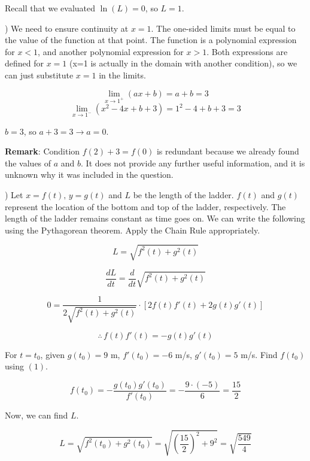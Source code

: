 \documentclass{article}
\begin{document}
\hfill

\noindent Recall that we evaluated $\ln(L) = 0$, so $\boxed{L = 1}$.

\hfill

) We need to ensure continuity at $x=1$. The one-sided limits must be equal to the value of the function at that point. The function is a polynomial expression for $x<1$, and another polynomial expression for $x>1$. Both expressions are defined for $x=1$ (x=1 is actually in the domain with another condition), so we can just substitute $x=1$ in the limits.

\[\lim_{x\to1^+} (ax+b) = a+b = 3\]
\[\lim_{x\to1^-} (x^2-4x+b+3) = 1^2 -4 +b+3 =  3\]

\noindent $\boxed{b=3}$, so $a+3 = 3\rightarrow \boxed{a = 0}$.

\hfill

\noindent \textbf{Remark}: Condition $f(2) + 3 = f(0)$ is redundant because we already found the values of $a$ and $b$. It does not provide any further useful information, and it is unknown why it was included in the question.

\hfill

) Let $x = f(t), \,y = g(t)$ and $L$ be the length of the ladder. $f(t)$ and $g(t)$ represent the location of the bottom and top of the ladder, respectively. The length of the ladder remains constant as time goes on. We can write the following using the Pythagorean theorem. Apply the Chain Rule appropriately.

\[L = \sqrt{f^2(t) + g^2(t)}\]

\[\frac{dL}{dt} = \frac{d}{dt}\sqrt{f^2(t) + g^2(t)}\]

\[0 = \frac{1}{2\sqrt{f^2(t)+g^2(t)}} \cdot [2f(t)f'(t) + 2g(t)g'(t)]\]

\begin{equation}\therefore \, f(t)f'(t) = -g(t)g'(t)\end{equation}

\hfill

\noindent For $t=t_0$, given $g(t_0) = 9$ m, $f'(t_0) = -6$ m/s, $g'(t_0) = 5$ m/s. Find $f(t_0)$ using $(1)$.

\[f(t_0) = -\frac{g(t_0)g'(t_0)}{f'(t_0)} = -\frac{9\cdot (-5)}{6} = \frac{15}{2}\]

\noindent Now, we can find $L$.

\[L =\sqrt{f^2(t_0) + g^2(t_0)} = \sqrt{\left(\frac{15}{2}\right)^2 + 9^2} = \sqrt{\frac{549}{4}}\]

\hfill
\end{document}
